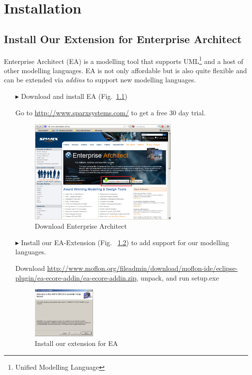 \chapter{Installation}
\label{chap:installation}

\section{Install Our Extension for Enterprise Architect}
Enterprise Architect (EA) is a modelling tool that supports
UML\footnote{Unified Modelling Language} and a host of other modelling
languages.  EA is not only affordable but is also quite flexible and can be
extended via \emph{addins} to support new modelling languages.
\vspace{-0.1cm}
\begin{enumerate}
\item[$\blacktriangleright$] Download and install EA
(Fig.~\ref{fig_enterpriseArchitextHomepage})
\item[] Go to \url{http://www.sparxsystems.com/} to get a free 30 day trial.
\begin{figure}[!h]
	\centering
  \includegraphics[width=0.7\textwidth]{pics/installationAndSetup/ea_download.png}
	\caption{Download Enterprise Architect}
	\label{fig_enterpriseArchitextHomepage}
\end{figure} 

\newpage

\item[$\blacktriangleright$] Install our EA-Extension (Fig.~
\ref{fig_eaPluginWizard}) to add support for our modelling languages.
\item[] Download
\url{http://www.moflon.org/fileadmin/download/moflon-ide/eclipse-plugin/ea-ecore-addin/ea-ecore-addin.zip},
unpack, and run setup.exe
\begin{figure}[!h]
	\centering
  \includegraphics[width=0.3\textwidth]{pics/installationAndSetup/eaplugin_install.png}
	\caption{Install our extension for EA}
	\label{fig_eaPluginWizard}
\end{figure}
\end{enumerate}
\vspace{-1cm}
 
